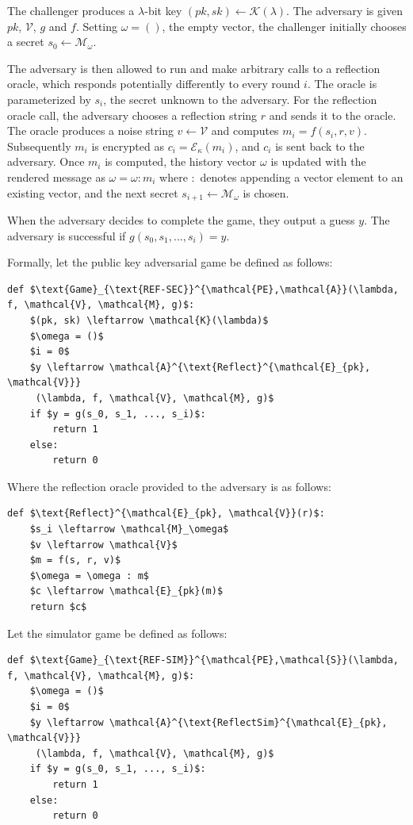\documentclass{sig-alternate-05-2015}
\begin{document}
The challenger produces a $\lambda$-bit key $(pk, sk) \leftarrow
\mathcal{K}(\lambda)$. The adversary is given $pk$, $\mathcal{V}$, $g$ and $f$.
Setting $\omega = ()$, the empty vector, the challenger initially chooses
a secret $s_0 \leftarrow \mathcal{M}_\omega$.

The adversary is then allowed to run and make arbitrary calls to a reflection
oracle, which responds potentially differently to every round $i$. The oracle
is parameterized by $s_i$, the secret unknown to the
adversary.  For the reflection oracle call, the adversary chooses a reflection
string $r$ and sends it to the oracle. The oracle produces a noise string
$v \leftarrow \mathcal{V}$ and computes $m_i = f(s_i, r, v)$. Subsequently
$m_i$ is encrypted as $c_i = \mathcal{E}_\kappa(m_i)$, and $c_i$ is sent back
to the adversary. Once $m_i$ is computed, the history vector $\omega$ is updated
with the rendered message as $\omega = \omega : m_i$ where $:$ denotes appending
a vector element to an existing vector, and the next secret $s_{i+1} \leftarrow \mathcal{M}_\omega$
is chosen.

When the adversary decides to complete the game, they output a guess $y$. The
adversary is successful if $g(s_0, s_1, ..., s_i) = y$.

Formally, let the public key adversarial game be defined as follows:

\begin{lstlisting}[texcl,mathescape]
def $\text{Game}_{\text{REF-SEC}}^{\mathcal{PE},\mathcal{A}}(\lambda, f, \mathcal{V}, \mathcal{M}, g)$:
    $(pk, sk) \leftarrow \mathcal{K}(\lambda)$
    $\omega = ()$
    $i = 0$
    $y \leftarrow \mathcal{A}^{\text{Reflect}^{\mathcal{E}_{pk}, \mathcal{V}}}
     (\lambda, f, \mathcal{V}, \mathcal{M}, g)$
    if $y = g(s_0, s_1, ..., s_i)$:
        return 1
    else:
        return 0
\end{lstlisting}

Where the reflection oracle provided to the adversary is as follows:

\begin{lstlisting}[texcl,mathescape]
def $\text{Reflect}^{\mathcal{E}_{pk}, \mathcal{V}}(r)$:
    $s_i \leftarrow \mathcal{M}_\omega$
    $v \leftarrow \mathcal{V}$
    $m = f(s, r, v)$
    $\omega = \omega : m$
    $c \leftarrow \mathcal{E}_{pk}(m)$
    return $c$
\end{lstlisting}

Let the simulator game be defined as follows:

\begin{lstlisting}[texcl,mathescape]
def $\text{Game}_{\text{REF-SIM}}^{\mathcal{PE},\mathcal{S}}(\lambda, f, \mathcal{V}, \mathcal{M}, g)$:
    $\omega = ()$
    $i = 0$
    $y \leftarrow \mathcal{A}^{\text{ReflectSim}^{\mathcal{E}_{pk}, \mathcal{V}}}
     (\lambda, f, \mathcal{V}, \mathcal{M}, g)$
    if $y = g(s_0, s_1, ..., s_i)$:
        return 1
    else:
        return 0
\end{lstlisting}
\end{document}
